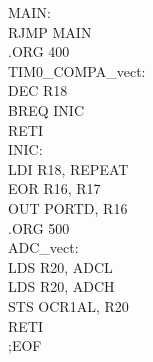 \documentclass[titlepage, a4paper, 10pt, reqno, openany]{report}
\begin{document}
\begin{minipage}[t]{.45\linewidth}
	\scriptsize
	MAIN: \\
	\hspace*{.5cm}	RJMP MAIN \\
	\newline
	.ORG 400 \\
	TIM0\_COMPA\_vect: \\
	\hspace*{.5cm}	DEC R18 \\
	\hspace*{.5cm}	BREQ INIC \\
	\hspace*{.5cm}	RETI \\
	INIC: \\
	\hspace*{.5cm}	LDI R18, REPEAT \\
	\hspace*{.5cm}	EOR R16, R17 \\
	\hspace*{.5cm}	OUT PORTD, R16 \\
	\newline
	.ORG 500 \\
	ADC\_vect: \\
	\hspace*{.5cm}	LDS R20, ADCL \\
	\hspace*{.5cm}	LDS R20, ADCH \\
	\hspace*{.5cm}	STS OCR1AL, R20 \\
	\hspace*{.5cm}	RETI \\
	;EOF
\end{minipage} \par
\end{document}
